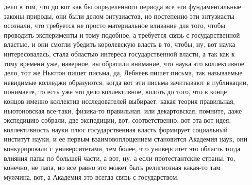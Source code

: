 дело в том,
что до вот как бы определенного периода все эти фундаментальные законы природы,
они были делом энтузиастов, но постепенно эти энтузиасты осознали, что требуется
не просто материальное вливание для того, чтобы проводить эксперименты и тому
подобное, а требуется связь с государственной властью, и они смогли убедить
королевскую власть в то, чтобы, ну, вот наука интересовалась, стала областью
интереса государственной власти, а так как к тому времени уже, наверное, вы
обратили внимание, что наука это коллективное дело, тот же Ньютон пишет письма,
да, Лебнеев пишет письма, так называемые невидимые колледжи образуются, когда
вот эти письма зачитывают в публикации, понимаете, то есть уже это дело
коллективное, вплоть до того, что в конце концов именно коллектив исследователей
выбирает, какая теория правильная, ньютоновская все-таки, физика-то правильная,
или декартовская, помните, даже экспедицию собрали, две экспедиции, вот,
соответственно, вот эта вот идея, коллективность науки плюс государственная
власть формирует социальный институт науки, и ее первым взаимовоплощением
становится Академия наук, они конкурировали с университетами, тем более, что
университет это область тогда влияния папы по большей части, а вот, ну, а если
протестантские страны, то, конечно, не папа, но все равно это может быть
религиозная какая-то там мужчина, вот, а Академия это всегда связь с
государством.
